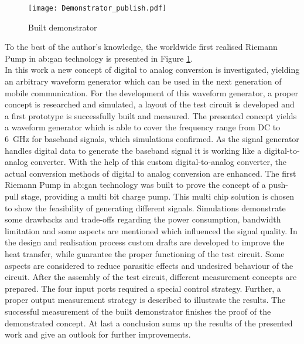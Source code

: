\begin{figure}[h] %
	\centering
  \texttt{[image: Demonstrator\_publish.pdf]}
	\caption{Built demonstrator}
	\label{fig:Demonstrator}
\end{figure}
To the best of the author's knowledge, the worldwide first realised Riemann Pump in \gls{ab:gan} technology is presented in Figure \ref{fig:Demonstrator}.\\

In this work a new concept of digital to analog conversion is investigated, yielding an arbitrary waveform generator which can be used in the next generation of mobile communication.
For the development of this waveform generator, a proper concept is researched and simulated, a layout of the test circuit is developed and a first prototype is successfully built and measured.
The presented concept yields a waveform generator which is able to cover the frequency range from DC to \SI{6}{\giga \hertz} for baseband signals, which simulations confirmed.
As the signal generator handles digital data to generate the baseband signal it is working like a digital-to-analog converter.
With the help of this custom digital-to-analog converter, the actual conversion methods of digital to analog conversion are enhanced.
The first Riemann Pump in \gls{ab:gan} technology was built to prove the concept of a push-pull stage, providing a multi bit charge pump.
This multi chip solution is chosen to show the feasibility of generating different signals.
Simulations demonstrate some drawbacks and trade-offs regarding the power consumption, bandwidth limitation and some aspects are mentioned which influenced the signal quality.
In the design and realisation process custom drafts are developed to improve the heat transfer, while guarantee the proper functioning of the test circuit.
Some aspects are considered to reduce parasitic effects and undesired behaviour of the circuit.
After the assembly of the test circuit, different measurement concepts are prepared.
The four input ports required a special control strategy.
Further, a proper output measurement strategy is described to illustrate the results.
The successful measurement of the built demonstrator finishes the proof of the demonstrated concept.
At last a conclusion sums up the results of the presented work and give an outlook for further improvements.





